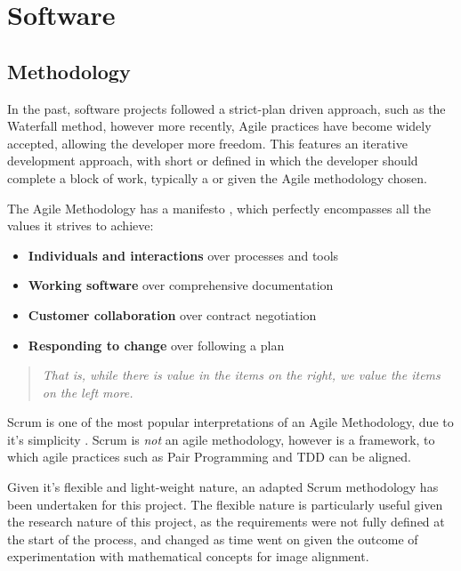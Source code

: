 \section{Software}

\subsection{Methodology}

In the past, software projects followed a strict-plan driven approach, such as the Waterfall method, however more recently, Agile practices have become widely accepted, allowing the developer more freedom. This features an iterative development approach, with short  or  defined in which the developer should complete a block of work, typically a  or  given the Agile methodology chosen.

The Agile Methodology has a manifesto \cite{Manifesto}, which perfectly encompasses all the values it strives to achieve:
\begin{itemize}
  \item \textbf{Individuals and interactions} over processes and tools
  \item \textbf{Working software} over comprehensive documentation
  \item \textbf{Customer collaboration} over contract negotiation
  \item \textbf{Responding to change} over following a plan
\end{itemize}

\begin{quotation}
  \textit{That is, while there is value in the items on the right, we value the items on the left more.}
\end{quotation}

Scrum is one of the most popular interpretations of an Agile Methodology, due to it's simplicity \cite{scrum}. Scrum is \textit{not} an agile methodology, however is a framework, to which agile practices such as Pair Programming and \acrfull{TDD} can be aligned.

Given it's flexible and light-weight nature, an adapted Scrum methodology has been undertaken for this project. The flexible nature is particularly useful given the research nature of this project, as the requirements were not fully defined at the start of the process, and changed as time went on given the outcome of experimentation with mathematical concepts for image alignment.

